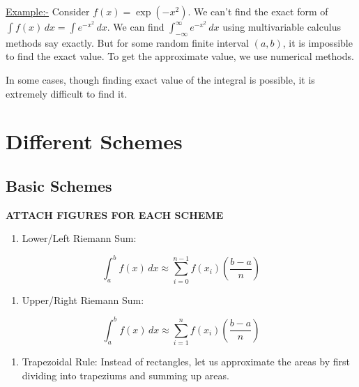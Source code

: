 \documentclass[
]{book}
\providecommand{\tightlist}{%
  \setlength{\itemsep}{0pt}\setlength{\parskip}{0pt}}
\begin{document}
\url{Example:-} Consider \(f(x) = \exp(-x^2)\). We can't find the exact form of \(\int f(x)\, dx = \int e^{-x^2}\, dx\). We can find \(\int_{-\infty}^{\infty} e^{-x^2}\, dx\) using multivariable calculus methods say exactly. But for some random finite interval \((a,b)\), it is impossible to find the exact value. To get the approximate value, we use numerical methods.

In some cases, though finding exact value of the integral is possible, it is extremely difficult to find it.

\hypertarget{different-schemes}{%
\section{Different Schemes}\label{different-schemes}}

\hypertarget{basic-schemes}{%
\subsection{Basic Schemes}\label{basic-schemes}}

\textbf{ATTACH FIGURES FOR EACH SCHEME}

\begin{enumerate}
\def\labelenumi{\arabic{enumi}.}
\tightlist
\item
  Lower/Left Riemann Sum:
\end{enumerate}

\begin{equation}
\int_a^b f(x) \, dx \approx \sum_{i=0}^{n-1} f(x_i) \left( \frac{b-a}{n} \right)
\end{equation}

\begin{enumerate}
\def\labelenumi{\arabic{enumi}.}
\setcounter{enumi}{1}
\tightlist
\item
  Upper/Right Riemann Sum:
\end{enumerate}

\begin{equation}
\int_a^b f(x) \, dx \approx \sum_{i=1}^{n} f(x_i) \left( \frac{b-a}{n} \right)
\end{equation}

\begin{enumerate}
\def\labelenumi{\arabic{enumi}.}
\setcounter{enumi}{2}
\tightlist
\item
  Trapezoidal Rule:
  Instead of rectangles, let us approximate the areas by first dividing into trapeziums and summing up areas.
\end{enumerate}
\end{document}
